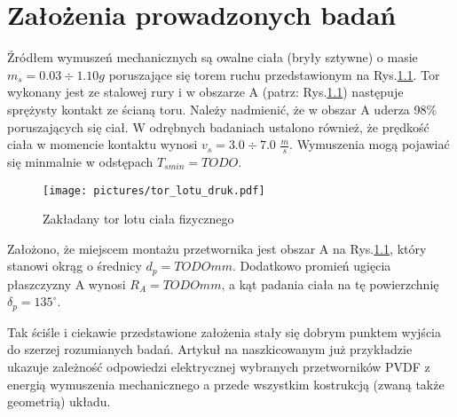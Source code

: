 \chapter{Założenia prowadzonych badań}
\label{sec:assumptions}

Źródłem wymuszeń mechanicznych są owalne ciała (bryły sztywne) o masie $m_s=0.03\div1.10 g$ poruszające się torem ruchu przedstawionym na Rys.\ref{fig:route}. Tor wykonany jest ze stalowej rury i w obszarze A (patrz: Rys.\ref{fig:route}) następuje sprężysty kontakt ze ścianą toru. Należy nadmienić, że w obszar A uderza 98\% poruszających się ciał. W odrębnych badaniach ustalono również, że prędkość ciała w momencie kontaktu wynosi $v_s=3.0\div7.0$ $\frac{m}{s}$. Wymuszenia mogą pojawiać się minmalnie w odstępach $T_{smin}=TODO$.

\begin{figure}[htbp]
\centering
\texttt{[image: pictures/tor\_lotu\_druk.pdf]}
\caption{Zakładany tor lotu ciała fizycznego}
\label{fig:route}
\end{figure}

Założono, że miejscem montażu przetwornika jest obszar A na Rys.\ref{fig:route}, który stanowi okrąg o średnicy $d_p=TODO mm$. Dodatkowo promień ugięcia płaszczyzny A wynosi $R_A=TODOmm$, a kąt padania ciała na tę powierzchnię $\delta_p=135^{\circ}$. 

Tak ściśle i ciekawie przedstawione założenia stały się dobrym punktem wyjścia do szerzej rozumianych badań. Artykuł na naszkicowanym już przykładzie ukazuje zależność odpowiedzi elektrycznej wybranych przetworników PVDF z energią wymuszenia mechanicznego a przede wszystkim kostrukcją (zwaną także geometrią) układu.
